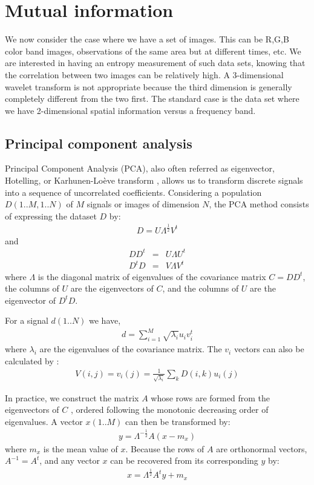 \section{Mutual information}
We now consider the case where we have a set of images. This can be
R,G,B color band images, observations of the same area but 
at different times, etc.
We are interested in having an entropy measurement 
of such data sets, knowing that the correlation between two images 
can be relatively high. A 3-dimensional wavelet transform is not 
appropriate because the third dimension is generally completely different
from the two first. The standard case is the data set where we have 
2-dimensional spatial information versus a frequency band.

\subsection{Principal component analysis}
Principal Component Analysis (PCA), also often referred as eigenvector,
Hotelling, 
or Karhunen-Lo\`eve transform 
\cite{ima:karhunen47,ima:loeve48,ima:hotelling33},
allows us to transform  discrete signals into a sequence of uncorrelated 
coefficients. Considering a population $D(1..M,1..N)$ 
of $M$ signals or images of dimension $N$,
the PCA method consists of expressing the dataset $D$ by:
\begin{eqnarray}
D = U \Lambda^{\frac{1}{2}} V^t
\end{eqnarray}
and
\begin{eqnarray}
DD^t & = & U \Lambda U^t \\
D^t D & = & V \Lambda V^t
\end{eqnarray}
where $\Lambda$ is the diagonal matrix of eigenvalues of the covariance 
matrix $C = DD^t$, the columns of $U$ are the eigenvectors of $C$, and 
the columns of $U$ are the eigenvector of $D^t D$. 

For a signal $d(1..N)$ we have,
\begin{eqnarray}
d = \sum_{i=1}^{M} \sqrt{\lambda_i} u_i v_i^t
\end{eqnarray}
where $\lambda_i$ are the eigenvalues of the covariance matrix. The $v_i$
vectors can also be calculated by \cite{ima:bijaoui79}:
\begin{eqnarray}
 V(i,j) = v_i(j) = \frac{1}{\sqrt{\lambda_i}} \sum_k D(i,k) u_i(j)
\end{eqnarray}

In practice, we construct the matrix $A$ whose rows are formed 
from the eigenvectors
of $C$ \cite{ima:gonzalez93}, ordered following the 
monotonic decreasing order of eigenvalues. A vector $x(1..M)$ can then be
transformed by:
\begin{eqnarray}
y = \Lambda^{-\frac{1}{2}}A(x-m_x)
\end{eqnarray}
where $m_x$ is the mean value of $x$.
Because the rows of $A$ are orthonormal vectors, $A^{-1} = A^t$, and
any vector $x$ can be recovered from its corresponding $y$ by:
\begin{eqnarray}
x = \Lambda^{\frac{1}{2}}A^t y + m_x
\end{eqnarray}

